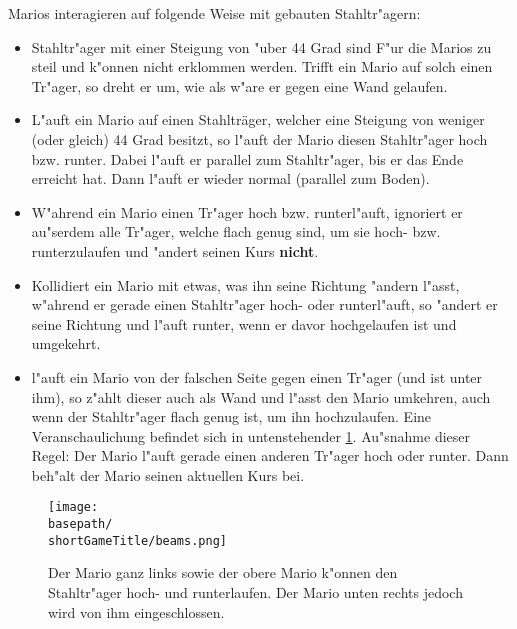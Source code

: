 Marios interagieren auf folgende Weise mit gebauten Stahltr"agern:
\begin{itemize}
\item Stahltr"ager mit einer Steigung von "uber 44 Grad sind F"ur die Marios zu steil und k"onnen nicht erklommen werden. Trifft ein Mario auf solch einen Tr"ager, so dreht er um, wie als w"are er gegen eine Wand gelaufen.\\
\item L"auft ein Mario auf einen Stahlträger, welcher eine Steigung von weniger (oder gleich) 44 Grad besitzt, so l"auft der Mario diesen Stahltr"ager hoch bzw. runter.
Dabei l"auft er parallel zum Stahltr"ager, bis er das Ende erreicht hat. Dann l"auft er wieder normal (parallel zum Boden).\\
\item W"ahrend ein Mario einen Tr"ager hoch bzw. runterl"auft, ignoriert er au"serdem alle Tr"ager, welche flach genug sind, um sie hoch- bzw. runterzulaufen und "andert seinen Kurs \textbf{nicht}.\\
\item Kollidiert ein Mario mit etwas, was ihn seine Richtung "andern l"asst, w"ahrend er gerade einen Stahltr"ager hoch- oder runterl"auft, so "andert er seine Richtung und l"auft runter, wenn er davor hochgelaufen ist und umgekehrt.\\
\item l"auft ein Mario von der falschen Seite gegen einen Tr"ager (und ist unter ihm), so z"ahlt dieser auch als Wand und l"asst den Mario umkehren, auch wenn der Stahltr"ager flach genug ist, um ihn hochzulaufen. Eine Veranschaulichung befindet sich in untenstehender \ref{beams}.
Au"snahme dieser Regel: Der Mario l"auft gerade einen anderen Tr"ager hoch oder runter. Dann beh"alt der Mario seinen aktuellen Kurs bei.
\end{itemize}

\begin{figure}[htb]
\begin{center}

\texttt{[image: \\basepath/\\shortGameTitle/beams.png]}
\caption{Der Mario ganz links sowie der obere Mario k"onnen den Stahltr"ager hoch- und runterlaufen. Der Mario unten rechts jedoch wird von ihm eingeschlossen.}
\label{beams}
\end{center}
\end{figure}